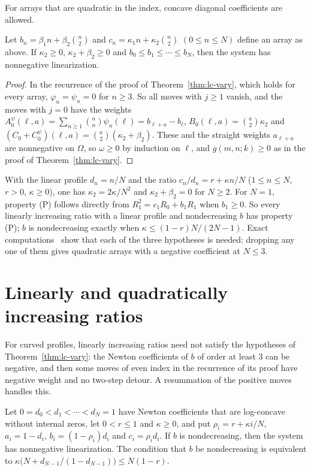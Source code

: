 For arrays that are quadratic in the index, concave diagonal coefficients are allowed.

\begin{proposition}\label{prop:lc-quad}
Let $b_n=\beta_1n+\beta_2\binom n2$ and $c_n=\kappa_1n+\kappa_2\binom n2$ $(0\leq n\leq N)$ define an array as above. If $\kappa_2\geq0$, $\kappa_2+\beta_2\geq0$ and $b_0\leq b_1\leq\cdots\leq b_N$, then the system has nonnegative linearization.
\end{proposition}

\begin{proof}
In the recurrence of the proof of Theorem~\ref{thm:lc-vary}, which holds for every array, $\varphi_n=\psi_n=0$ for $n\geq3$. So all moves with $j\geq1$ vanish, and the moves with $j=0$ have the weights $A^\psi_0(\ell,a)=\sum_{n\geq1}\binom an\psi_n(\ell)=b_{\ell+a}-b_\ell$, $B_0(\ell,a)=\binom a2\kappa_2$ and $(C_0+C^\psi_0)(\ell,a)=\binom a2(\kappa_2+\beta_2)$. These and the straight weights $a_{\ell+a}$ are nonnegative on $\Omega$, so $\omega\geq0$ by induction on $\ell$, and $g(m,n;k)\geq0$ as in the proof of Theorem~\ref{thm:lc-vary}.
\end{proof}

With the linear profile $d_n=n/N$ and the ratio $c_n/d_n=r+\kappa n/N$ ($1\leq n\leq N$, $r>0$, $\kappa\geq0$), one has $\kappa_2=2\kappa/N^2$ and $\kappa_2+\beta_2=0$ for $N\geq2$. For $N=1$, property (P) follows directly from $R_1^2=c_1R_0+b_1R_1$ when $b_1\geq0$. So every linearly increasing ratio with a linear profile and nondecreasing $b$ has property (P); $b$ is nondecreasing exactly when $\kappa\leq(1-r)N/(2N-1)$. Exact computations~\cite{code} show that each of the three hypotheses is needed: dropping any one of them gives quadratic arrays with a negative coefficient at $N\leq3$.

\section{Linearly and quadratically increasing ratios}\label{sec:affine}
For curved profiles, linearly increasing ratios need not satisfy the hypotheses of Theorem~\ref{thm:lc-vary}: the Newton coefficients of $b$ of order at least $3$ can be negative, and then some moves of even index in the recurrence of its proof have negative weight and no two-step detour. A resummation of the positive moves handles this.

\begin{theorem}\label{thm:lc-affine}
Let $0=d_0<d_1<\cdots<d_N=1$ have Newton coefficients that are log-concave without internal zeros, let $0<r\leq1$ and $\kappa\geq0$, and put $\rho_i=r+\kappa i/N$, $a_i=1-d_i$, $b_i=(1-\rho_i)d_i$ and $c_i=\rho_id_i$. If $b$ is nondecreasing, then the system has nonnegative linearization. The condition that $b$ be nondecreasing is equivalent to $\kappa\bigl(N+d_{N-1}/(1-d_{N-1})\bigr)\leq N(1-r)$.
\end{theorem}

